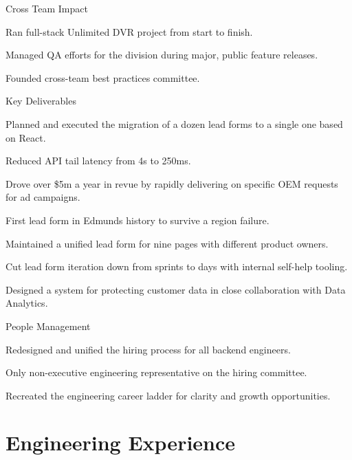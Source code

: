 \documentclass[]{deedy-resume-openfont}
\begin{document}
Cross Team Impact
\begin{tightemize}
\item Ran full-stack Unlimited DVR project from start to finish.
\item Managed QA efforts for the division during major, public feature releases.
\item Founded cross-team best practices committee.
\end{tightemize}
\sectionsep

\vspace{\topsep}
Key Deliverables
\begin{tightemize}
\item Planned and executed the migration of a dozen lead forms to a single one based on React.
\item Reduced API tail latency from 4s to 250ms.
\item Drove over \$5m a year in revue by rapidly delivering on specific OEM requests for ad campaigns.
\item First lead form in Edmunds history to survive a region failure.
\item Maintained a unified lead form for nine pages with different product owners.
\item Cut lead form iteration down from sprints to days with internal self-help tooling.
\item Designed a system for protecting customer data in close collaboration with Data Analytics.
\end{tightemize}
\sectionsep
People Management
\begin{tightemize}
  \item Redesigned and unified the hiring process for all backend engineers.
  \item Only non-executive engineering representative on the hiring committee.
  \item Recreated the engineering career ladder for clarity and growth opportunities.
\end{tightemize}

\pagebreak

\section{Engineering Experience}
\end{document}
